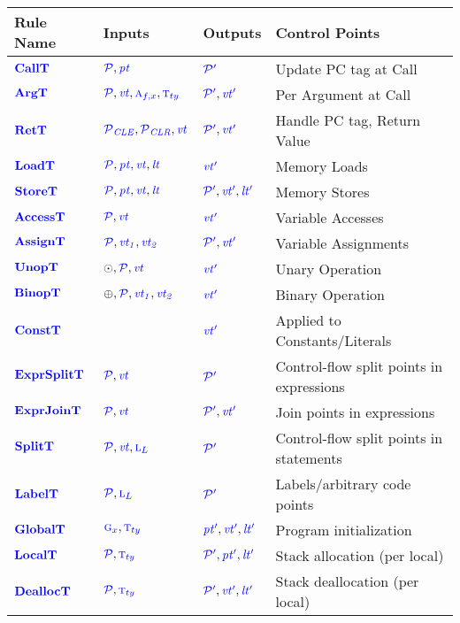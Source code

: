 \documentclass{llncs}
\begin{document}
\begin{table}[t]
  \begin{tabular}{|l|l|l|l|}
    \hline
    Rule Name & Inputs & Outputs & Control Points \\
    \hline
    \(\calltname\)      & \(\calltargs\)         & \(\calltres\)      & Update PC tag at Call \\
    \(\argtname\)       & \(\argtargs\)          & \(\argtres\)       & Per Argument at Call \\
    \(\rettname\)       & \(\rettargs\)          & \(\rettres\)       & Handle PC tag, Return Value \\
    \(\loadtname\)      & \(\loadtargs\)         & \(\loadtres\)      & Memory Loads \\
    \(\storetname\)     & \(\storetargs\)        & \(\storetres\)     & Memory Stores \\
    \(\accesstname\)    & \(\accesstargs\)       & \(\accesstres\)    & Variable Accesses \\
    \(\assigntname\)    & \(\assigntargs\)       & \(\assigntres\)    & Variable Assignments \\
    \(\unoptname\)      & \(\unoptargs\)         & \(\unoptres\)      & Unary Operation \\
    \(\binoptname\)     & \(\binoptargs\)        & \(\binoptres\)     & Binary Operation \\
    \(\consttname\)     &                        & \(\consttres\)     & Applied to Constants/Literals \\
    \(\exprsplittname\) & \(\exprsplittargs\)    & \(\exprsplittres\) & Control-flow split points in expressions \\
    \(\exprjointname\)  & \(\exprjointargs\)     & \(\exprjointres\)  & Join points in expressions \\
    \(\splittname\)     & \(\splittargs\)        & \(\splittres\)     & Control-flow split points in statements\\
    \(\labeltname\)     & \(\labeltargs\)        & \(\labeltres\)     & Labels/arbitrary code points \\
    \(\globaltname\)    & \(\globaltargs\)       & \(\globaltres\)    & Program initialization \\
    \(\localtname\)     & \(\localtargs\)        & \(\localtres\)     & Stack allocation (per local) \\
    \(\dealloctname\)   & \(\dealloctargs\)      & \(\dealloctres\)   & Stack deallocation (per local) \\

\end{tabular}
\end{table}
\end{document}
